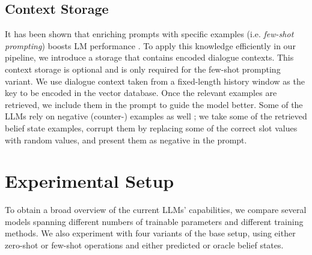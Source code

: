 \subsection{Context Storage}
\label{07:sec:context-store}
It has been shown that enriching prompts with specific examples (i.e. \emph{few-shot prompting}) boosts LM performance \cite{madotto2020language,brown2020language}.
To apply this knowledge efficiently in our pipeline, we introduce a storage that contains encoded dialogue contexts.
This context storage is optional and is only required for the few-shot prompting variant.
We use dialogue context taken from a fixed-length history window as the key to be encoded in the vector database.
Once the relevant examples are retrieved, we include them in the prompt to guide the model better.
Some of the LLMs rely on negative (counter-) examples as well \cite{supernaturalinstructions}; we take some of the retrieved belief state examples, corrupt them by replacing some of the correct slot values with random values, and present them as negative in the prompt.

\section{Experimental Setup}
\label{07:sec:experiments}

To obtain a broad overview of the current LLMs' capabilities, we compare several models spanning different numbers of trainable parameters and different training methods. 
We also experiment with four variants of the base setup, using either zero-shot or few-shot operations and either predicted or oracle belief states.

